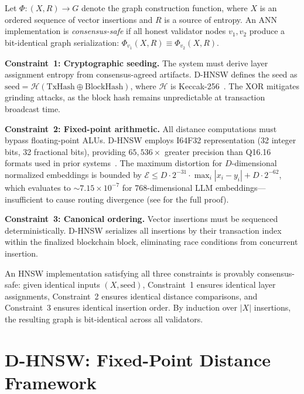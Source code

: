 \documentclass[10pt,journal]{IEEEtran}
\newcommand{\dhnsw}{\textsc{D-HNSW}}
\newcommand{\hnsw}{\textsc{HNSW}}
\begin{document}
Let $\Phi: (X, R) \rightarrow G$ denote the graph construction function, where $X$ is an ordered sequence of vector insertions and $R$ is a source of entropy. An ANN implementation is \emph{consensus-safe} if all honest validator nodes $v_1, v_2$ produce a bit-identical graph serialization: $\Phi_{v_1}(X, R) \equiv \Phi_{v_2}(X, R)$.

\textbf{Constraint~1: Cryptographic seeding.} The system must derive layer assignment entropy from consensus-agreed artifacts. \dhnsw{} defines the seed as $\text{seed} = \mathcal{H}(\text{TxHash} \oplus \text{BlockHash})$, where $\mathcal{H}$ is Keccak-256~\cite{bertoni2013keccak}. The XOR mitigates grinding attacks, as the block hash remains unpredictable at transaction broadcast time.

\textbf{Constraint~2: Fixed-point arithmetic.} All distance computations must bypass floating-point ALUs. \dhnsw{} employs I64F32 representation (32 integer bits, 32 fractional bits), providing $65{,}536\times$ greater precision than Q16.16 formats used in prior systems~\cite{gudur2025valori}. The maximum distortion for $D$-dimensional normalized embeddings is bounded by $\mathcal{E} \leq D \cdot 2^{-31} \cdot \max_i |x_i - y_i| + D \cdot 2^{-62}$, which evaluates to $\sim 7.15 \times 10^{-7}$ for 768-dimensional LLM embeddings---insufficient to cause routing divergence (see  for the full proof).

\textbf{Constraint~3: Canonical ordering.} Vector insertions must be sequenced deterministically. \dhnsw{} serializes all insertions by their transaction index within the finalized blockchain block, eliminating race conditions from concurrent insertion.

An \hnsw{} implementation satisfying all three constraints is provably consensus-safe: given identical inputs $(X, \text{seed})$, Constraint~1 ensures identical layer assignments, Constraint~2 ensures identical distance comparisons, and Constraint~3 ensures identical insertion order. By induction over $|X|$ insertions, the resulting graph is bit-identical across all validators.


\section{D-HNSW: Fixed-Point Distance Framework}
\label{sec:method}
\end{document}
